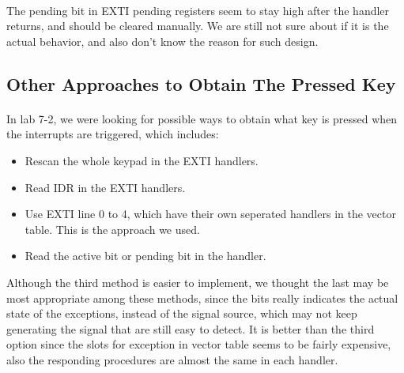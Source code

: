 \paragraph{}
The pending bit in EXTI pending registers seem to stay high after the handler returns, and should be cleared manually.
We are still not sure about if it is the actual behavior, and also don't know the reason for such design.
\subsection{Other Approaches to Obtain The Pressed Key}
\paragraph{}
In lab 7-2, we were looking for possible ways to obtain what key is pressed when the interrupts are triggered, which includes:
\begin{itemize}
\item Rescan the whole keypad in the EXTI handlers.
\item Read IDR in the EXTI handlers.
\item Use EXTI line 0 to 4, which have their own seperated handlers in the vector table. This is the approach we used.
\item Read the active bit or pending bit in the handler.
\end{itemize}
Although the third method is easier to implement,
we thought the last may be most appropriate among these methods,
since the bits really indicates the actual state of the exceptions, 
instead of the signal source, which may not keep generating the signal that are still easy to detect.
It is better than the third option since the slots for exception in vector table seems to be fairly expensive,
also the responding procedures are almost the same in each handler.

